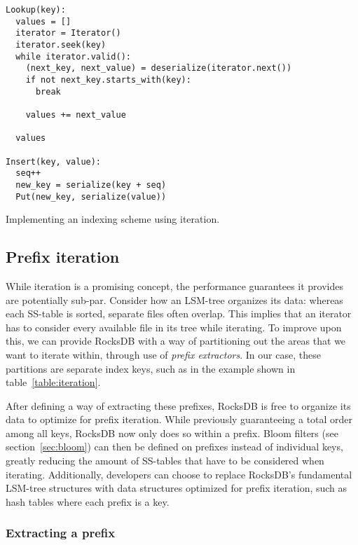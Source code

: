 \begin{listing}[H]
  \begin{verbatim}
Lookup(key):
  values = []
  iterator = Iterator()
  iterator.seek(key)
  while iterator.valid():
    (next_key, next_value) = deserialize(iterator.next())
    if not next_key.starts_with(key):
      break

    values += next_value

  values

Insert(key, value):
  seq++
  new_key = serialize(key + seq)
  Put(new_key, serialize(value))
  \end{verbatim}

  \caption{Implementing an indexing scheme using iteration.}\label{lst:iteration-example}
\end{listing}


\subsection{Prefix iteration}\label{sec:prefix-iteration}

While iteration is a promising concept, the performance guarantees it provides
are potentially sub-par. Consider how an LSM-tree organizes its data: whereas
each SS-table is sorted, separate files often overlap. This implies that an
iterator has to consider every available file in its tree while iterating. To
improve upon this, we can provide RocksDB with a way of partitioning out the
areas that we want to iterate within, through use of \textit{prefix
extractors}. In our case, these partitions are separate index keys, such as
 in the example shown in table~\ref{table:iteration}.

After defining a way of extracting these prefixes, RocksDB is free to organize
its data to optimize for prefix iteration. While previously guaranteeing a total
order among all keys, RocksDB now only does so within a prefix. Bloom filters
(see section~\ref{sec:bloom}) can then be defined on prefixes instead of
individual keys, greatly reducing the amount of SS-tables that have to be
considered when iterating. Additionally, developers can choose to replace
RocksDB's fundamental LSM-tree structures with data structures optimized for
prefix iteration, such as hash tables where each prefix is a key.

\subsubsection{Extracting a prefix}

